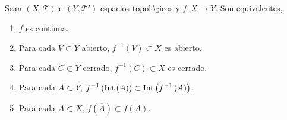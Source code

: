 \begin{prop}
Sean $\displaystyle \left(X, \mathcal{T}\right) $ e $\displaystyle \left(Y, \mathcal{T}'\right) $ espacios topológicos y $\displaystyle f : X \to Y $. Son equivalentes,
\begin{enumerate}
\item $\displaystyle f $ es continua. 
\item Para cada $\displaystyle V \subset Y $ abierto, $\displaystyle f^{-1}\left(V\right)\subset X $ es abierto. 
\item Para cada $\displaystyle C \subset Y $ cerrado, $\displaystyle f^{-1}\left(C\right)\subset X $ es cerrado. 
\item Para cada $\displaystyle A \subset Y $, $\displaystyle f^{-1}\left(\operatorname{Int}\left(A\right)\right)\subset\operatorname{Int}\left(f^{-1}\left(A\right)\right) $. 
\item Para cada $\displaystyle A \subset X $, $\displaystyle f\left(\overline{A}\right)\subset\overline{f\left(A\right)} $. 
\end{enumerate}
\end{prop}
